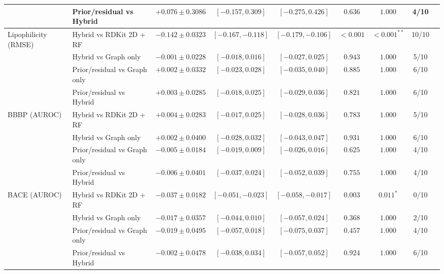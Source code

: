 \documentclass[10pt,a4paper]{article}
\begin{document}
\begin{table}[H]
{\begin{tabular}{@{}llccccccc@{}}
 & Prior/residual vs Hybrid & $+0.076\pm0.3086$ & $[-0.157,0.309]$ & $[-0.275,0.426]$ & $0.636$ & $1.000$ & 4/10 \\
\midrule
Lipophilicity (RMSE) & Hybrid vs RDKit 2D + RF & $-0.142\pm0.0323$ & $[-0.167,-0.118]$ & $[-0.179,-0.106]$ & $<0.001$ & $<0.001^{**}$ & 10/10 \\
 & Hybrid vs Graph only & $-0.001\pm0.0228$ & $[-0.018,0.016]$ & $[-0.027,0.025]$ & $0.943$ & $1.000$ & 5/10 \\
 & Prior/residual vs Graph only & $+0.002\pm0.0332$ & $[-0.023,0.028]$ & $[-0.035,0.040]$ & $0.885$ & $1.000$ & 6/10 \\
 & Prior/residual vs Hybrid & $+0.003\pm0.0285$ & $[-0.018,0.025]$ & $[-0.029,0.036]$ & $0.821$ & $1.000$ & 6/10 \\
\midrule
BBBP (AUROC) & Hybrid vs RDKit 2D + RF & $+0.004\pm0.0283$ & $[-0.017,0.025]$ & $[-0.028,0.036]$ & $0.783$ & $1.000$ & 5/10 \\
 & Hybrid vs Graph only & $+0.002\pm0.0400$ & $[-0.028,0.032]$ & $[-0.043,0.047]$ & $0.931$ & $1.000$ & 6/10 \\
 & Prior/residual vs Graph only & $-0.005\pm0.0184$ & $[-0.019,0.009]$ & $[-0.026,0.016]$ & $0.625$ & $1.000$ & 4/10 \\
 & Prior/residual vs Hybrid & $-0.006\pm0.0401$ & $[-0.037,0.024]$ & $[-0.052,0.039]$ & $0.755$ & $1.000$ & 4/10 \\
\midrule
BACE (AUROC) & Hybrid vs RDKit 2D + RF & $-0.037\pm0.0182$ & $[-0.051,-0.023]$ & $[-0.058,-0.017]$ & $0.003$ & $0.011^{*}$ & 0/10 \\
 & Hybrid vs Graph only & $-0.017\pm0.0357$ & $[-0.044,0.010]$ & $[-0.057,0.024]$ & $0.368$ & $1.000$ & 2/10 \\
 & Prior/residual vs Graph only & $-0.019\pm0.0495$ & $[-0.057,0.018]$ & $[-0.075,0.037]$ & $0.457$ & $1.000$ & 4/10 \\
 & Prior/residual vs Hybrid & $-0.002\pm0.0478$ & $[-0.038,0.034]$ & $[-0.057,0.052]$ & $0.924$ & $1.000$ & 6/10 \\
\bottomrule
\end{tabular}
}
\end{table}
\end{document}
